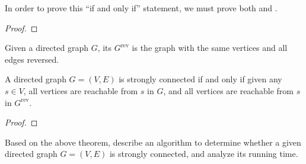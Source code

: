\documentclass{tufte-handout}
\begin{document}
\begin{questions}
  \item In order to prove this ``if and only if'' statement, we must
    prove both \blank\linebreak and \blank.
\end{questions}
\begin{proof}
  \mbox{} \vfill \mbox{}
\end{proof}

\newpage
\begin{defn}
  Given a directed graph $G$, its 
  $G^{\mathrm{rev}}$ is the graph with the same vertices and all edges
  reversed.
\end{defn}

\begin{thm}
  A directed graph $G = (V,E)$ is strongly connected if and only if
  given any $s \in V$, all vertices are reachable from $s$ in $G$, and
  all vertices are reachable from $s$ in $G^{\mathrm{rev}}$.
\end{thm}

\begin{proof} 
  \mbox{} \vspace{2in}

  \mbox{}
\end{proof}

\begin{questions}
\item Based on the above theorem, describe an algorithm to determine
  whether a given directed graph $G = (V,E)$ is strongly connected,
  and analyze its running time.
\end{questions}




\end{document}
